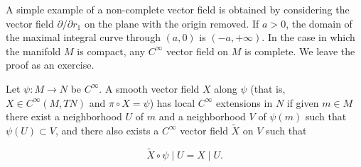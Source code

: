 \begin{remarks}\label{thm:1.50}
	A simple example of a non-complete vector field is obtained by considering the vector field $\partial/\partial r_{1}$ on the plane with the origin removed. If $a>0$, the domain of the maximal integral curve through $(a,0)$ is $(-a,+\infty)$. In the case in which the manifold $M$ is compact, any $C^{\infty}$ vector field on $M$ is complete. We leave the proof as an exercise.

\end{remarks}

\begin{definition}\label{thm:1.51}
	Let $\psi: M \to N$ be $C^\infty$. A smooth vector field $X$ along $\psi$ (that is, $X \in C^\infty(M, TN)$ and $\pi \circ X = \psi$) has local $C^\infty$ extensions in $N$ if given $m \in M$ there exist a neighborhood $U$ of $m$ and a neighborhood $V$ of $\psi(m)$ such that $\psi(U) \subset V$, and there also exists a $C^\infty$ vector field $\tilde{X}$ on $V$ such that

	\begin{equation}
		\tag{1}\label{eq:1.51:1}
		\tilde{X}\circ\psi\mid U=X\mid U.
	\end{equation}

\end{definition}

